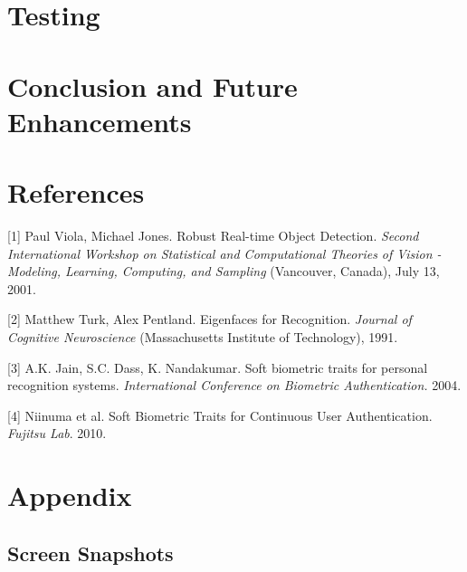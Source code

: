 \documentclass[12pt]{article}			%
\begin{document}
\section{ Testing }

\section{ Conclusion and Future Enhancements }

\section{ References }
[1] Paul Viola, Michael Jones. Robust Real-time Object Detection. \textit {Second International Workshop on Statistical and Computational Theories of Vision - Modeling, Learning, Computing, and Sampling} (Vancouver, Canada), July 13, 2001. 

[2] Matthew Turk, Alex Pentland. Eigenfaces for Recognition. \textit {Journal of Cognitive Neuroscience} (Massachusetts Institute of Technology), 1991. 

[3] A.K. Jain, S.C. Dass, K. Nandakumar. Soft biometric traits for personal recognition systems. \textit{ International Conference on Biometric Authentication.} 2004.
 
[4] Niinuma et al. Soft Biometric Traits for Continuous User Authentication. \textit{Fujitsu Lab}. 2010.

\section{ Appendix }
\subsection{ Screen Snapshots}

\end{document}
